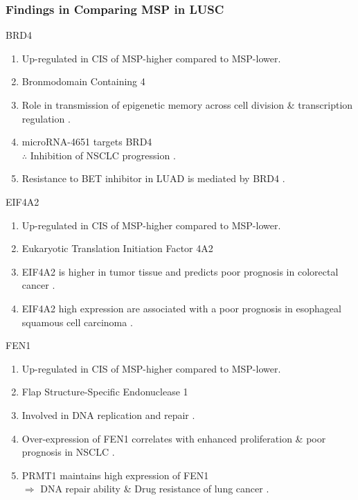 \documentclass{beamer}
\begin{document}
    \begin{frame}[allowframebreaks]
        \frametitle{Findings in Comparing MSP in LUSC}

        \begin{block}{BRD4}
            \begin{enumerate}
                \item Up-regulated in CIS of MSP-higher compared to MSP-lower.
                \item Bronmodomain Containing 4
                \item Role in transmission of epigenetic memory across cell division \& transcription regulation \cite{BRD4-1}.
                \item microRNA-4651 targets BRD4 \\
                    $\therefore$ Inhibition of NSCLC progression \cite{BRD4-2}.
                \item Resistance to BET inhibitor in LUAD is mediated by BRD4 \cite{BRD4-3}.
            \end{enumerate}
        \end{block}

         \begin{block}{EIF4A2}
            \begin{enumerate}
                \item Up-regulated in CIS of MSP-higher compared to MSP-lower.
                \item Eukaryotic Translation Initiation Factor 4A2
                \item EIF4A2 is higher in tumor tissue and predicts poor prognosis in colorectal cancer \cite{EIF4A2-1}.
                \item EIF4A2 high expression are associated with a poor prognosis in esophageal squamous cell carcinoma \cite{EIF4A2-2}.
            \end{enumerate}
        \end{block}

         \begin{block}{FEN1}
            \begin{enumerate}
                \item Up-regulated in CIS of MSP-higher compared to MSP-lower.
                \item Flap Structure-Specific Endonuclease 1
                \item Involved in DNA replication and repair \cite{FEN1-1}.
                \item Over-expression of FEN1 correlates with enhanced proliferation \& poor prognosis in NSCLC \cite{FEN1-2}.
                \item PRMT1 maintains high expression of FEN1 \\
                    $\Rightarrow$ DNA repair ability \& Drug resistance of lung cancer \cite{FEN1-3}.
            \end{enumerate}
        \end{block}


\end{frame}
\end{document}
